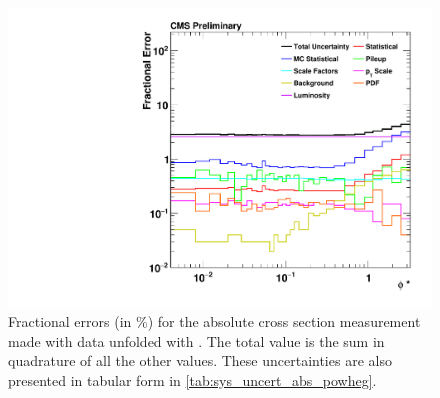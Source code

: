 \begin{figure}[!p]
    \centering
    \includegraphics[width=\textwidth]{figures/data_uncertainty_absolute_powheg_unfolded.pdf}
    \caption[
        Fractional errors (in \%) for the absolute cross section measurement
        made with data unfolded with \POWHEG.
    ]{
        Fractional errors (in \%) for the absolute cross section measurement
        made with data unfolded with \POWHEG. The total value is the sum in
        quadrature of all the other values. These uncertainties are also
        presented in tabular form in \cref{tab:sys_uncert_abs_powheg}.
    }
    \label{fig:sys_uncert_abs_powheg}
\end{figure}
